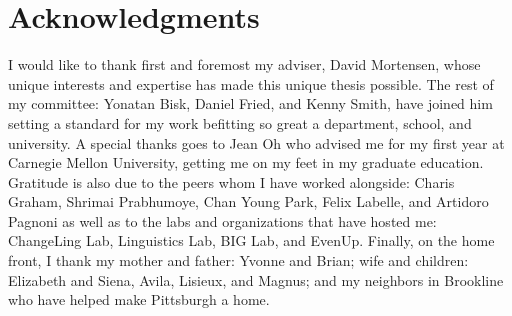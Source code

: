 \vfill

\pagebreak
\thispagestyle{plain}

\null\vfill
\section*{Acknowledgments}

I would like to thank first and foremost my adviser, David Mortensen, whose unique interests and expertise has made this unique thesis possible.
The rest of my committee: Yonatan Bisk, Daniel Fried, and Kenny Smith, have joined him setting a standard for my work befitting so great a department, school, and university.
A special thanks goes to Jean Oh who advised me for my first year at Carnegie Mellon University, getting me on my feet in my graduate education.
Gratitude is also due to the peers whom I have worked alongside:
    Charis Graham,
    Shrimai Prabhumoye,
    Chan Young Park,
    Felix Labelle,
    and Artidoro Pagnoni
  as well as to the labs and organizations that have hosted me:
  ChangeLing Lab,
    Linguistics Lab,
    BIG Lab,
    and EvenUp.
Finally, on the home front, I thank my
  mother and father: Yvonne and Brian;
  wife and children: Elizabeth and Siena, Avila, Lisieux, and Magnus;
  and my neighbors in Brookline who have helped make Pittsburgh a home.

\vfill

